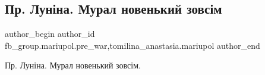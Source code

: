  
 
 
 
 

\subsection{Пр. Луніна. Мурал новенький зовсім}
\label{sec:11_02_2023.fb.fb_group.mariupol.pre_war.2.primorskii_bulvar__m}
 
\ifcmt
 author_begin
   author_id fb_group.mariupol.pre_war,tomilina_anastasia.mariupol
 author_end
\fi

Пр. Луніна. Мурал новенький зовсім.

